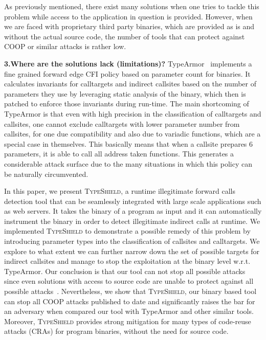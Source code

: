 As previously mentioned, there exist many solutions when one tries to tackle this problem while access
to the application in question is provided. However, when we are faced with proprietary third party 
binaries, which are provided as is and without the actual source code, the number of tools that can
protect against COOP or similar attacks is rather low.

\textbf{3.Where are the solutions lack (limitations)?} TypeArmor~\cite{veen:typearmor} implements a fine grained forward edge CFI 
policy based on parameter count for binaries. It calculates invariants for calltargets and indirect callsites based on
the number of parameters they use by leveraging static analysis of the binary, which then is
patched to enforce those invariants during run-time. The main shortcoming of TypeArmor is that
even with high precision in the classification of 
calltargets and callsites, one cannot exclude calltargets with lower parameter number from 
callsites, for one due compatibility and also due to variadic functions, which are a special
case in themselves. This basically means that when a callsite prepares 6 parameters, it is 
able to call all address taken functions. This generates a considerable attack surface due to the many
situations in which this policy can be naturally circumvented.

In this paper, we present \textsc{TypeShield}, a runtime illegitimate forward 
calls detection tool that can be seamlessly integrated with large scale applications such as web servers.
It takes the binary of a program as input and it can automatically instrument the binary in order
to detect illegitimate indirect calls at runtime. 
We implemented \textsc{TypeShield} to demonstrate a possible remedy of this problem by introducing
parameter types into the classification of callsites and calltargets. We explore to
what extent we can further narrow down the set of possible targets for indirect callsites
and manage to stop the exploitation at the binary level w.r.t. TypeArmor.
Our conclusion is that our tool can not stop all possible attacks since even solutions 
with access to source code are unable to protect against all possible attacks~\cite{carlini:bending}.
Nevertheless, we show that \textsc{TypeShield}, our binary based tool can stop all 
COOP attacks published to date and significantly raises the bar for an adversary when compared our tool with 
TypeArmor and other similar tools. 
Moreover, \textsc{TypeShield} provides strong mitigation for many types of code-reuse attacks
(CRAs) for program binaries, without the need for source code. 

